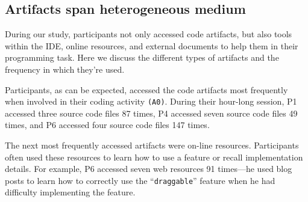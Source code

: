 




\subsection{Artifacts span heterogeneous medium}
During our study, participants not only accessed code artifacts, but also tools within the IDE, online resources, and external documents to help them in their programming task. Here we discuss the different types of artifacts and the frequency in which they're used.

Participants, as can be expected, accessed the code artifacts most frequently when involved in their coding activity \texttt{(A0)}. During their hour-long session, P1 accessed three source code files 87 times, P4 accessed seven source code files 49 times, and P6 accessed four source code files 147 times. 

The next most frequently accessed artifacts were on-line resources. Participants often used these resources to learn how to use a feature or recall implementation details. For example, P6 accessed seven web resources 91 times---he used blog posts to learn how to correctly use the ``\texttt{draggable}'' feature when he had difficulty implementing the feature. 

